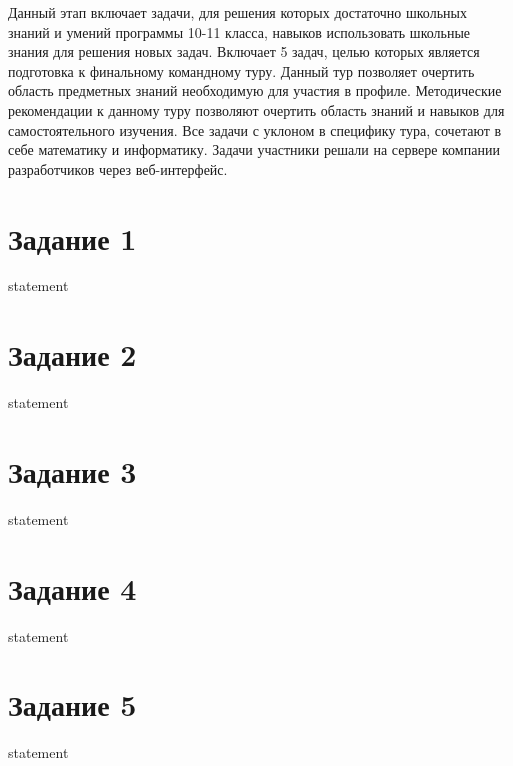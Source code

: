 Данный этап включает задачи, для решения которых достаточно школьных знаний и умений программы 10-11 класса, навыков использовать школьные знания для решения новых задач. Включает 5 задач, целью которых является подготовка к финальному командному туру.  Данный тур позволяет очертить область предметных знаний необходимую для участия в профиле. Методические рекомендации к данному туру позволяют очертить область знаний и навыков для самостоятельного изучения. Все задачи с уклоном в специфику тура, сочетают в себе математику и информатику. Задачи участники решали на сервере компании разработчиков через веб-интерфейс.

\section{Задание 1}

{statement}

\section{Задание 2}

{statement}

\section{Задание 3}

{statement}

\section{Задание 4}

{statement}

\section{Задание 5}

{statement}